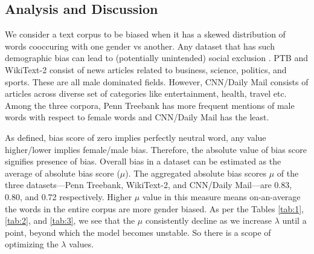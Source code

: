 \documentclass[11pt,a4paper]{article}
\begin{document}



\subsection{Analysis and Discussion}
\label{analysis}
 We consider a text corpus to be biased when it has a skewed distribution of words cooccuring with one gender vs another. Any dataset that has such demographic bias can lead to (potentially unintended) social exclusion  \cite{hovy2015demographic}. PTB and WikiText-2 consist of news articles  related to business, science, politics, and sports. These are all male dominated fields. However, CNN/Daily Mail consists of articles across diverse set of categories like entertainment, health, travel etc. Among the three corpora, Penn Treebank has more frequent mentions of male words with respect to female words and CNN/Daily Mail has the least. 
 
As defined, bias score of zero implies perfectly neutral word, any value higher/lower implies female/male bias. Therefore, the absolute value of bias score signifies presence of bias. Overall bias in a dataset can be estimated as the average of absolute bias score ($\mu$). The aggregated absolute bias scores $\mu$ of the three datasets---Penn Treebank,  WikiText-2, and CNN/Daily Mail---are 0.83, 0.80, and 0.72 respectively. Higher $\mu$ value in this measure means on-an-average the words in the entire corpus are more gender biased. As per the Tables \ref{tab:1}, \ref{tab:2}, and \ref{tab:3}, we see that the $\mu$ consistently decline as we increase $\lambda$ until a point, beyond which the model becomes unstable. So there is a scope of optimizing the $\lambda$ values. 
\end{document}
